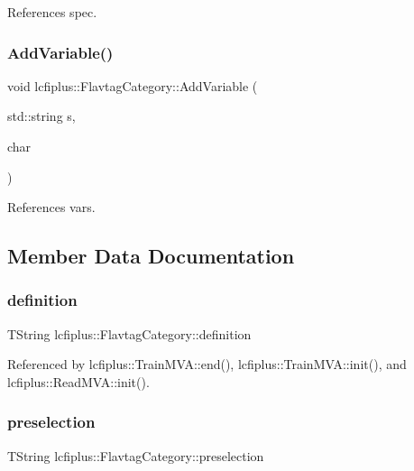 References spec.

\mbox{\label{structlcfiplus_1_1FlavtagCategory_a4d9be1da44e5d6abb7f7638aae7833c7}} 
\subsubsection{Add\+Variable()}
{\footnotesize\ttfamily void lcfiplus\+::\+Flavtag\+Category\+::\+Add\+Variable (\begin{DoxyParamCaption}\item[{std\+::string}]{s,  }\item[{char}]{ }\end{DoxyParamCaption})\hspace{0.3cm}{\ttfamily [inline]}}



References vars.



\subsection{Member Data Documentation}
\mbox{\label{structlcfiplus_1_1FlavtagCategory_a5ff949e40f053671861538f57caea455}} 
\subsubsection{definition}
{\footnotesize\ttfamily T\+String lcfiplus\+::\+Flavtag\+Category\+::definition}



Referenced by lcfiplus\+::\+Train\+M\+V\+A\+::end(), lcfiplus\+::\+Train\+M\+V\+A\+::init(), and lcfiplus\+::\+Read\+M\+V\+A\+::init().

\mbox{\label{structlcfiplus_1_1FlavtagCategory_a3801d17f9bb0595ba0da547a4d7f261b}} 
\subsubsection{preselection}
{\footnotesize\ttfamily T\+String lcfiplus\+::\+Flavtag\+Category\+::preselection}



